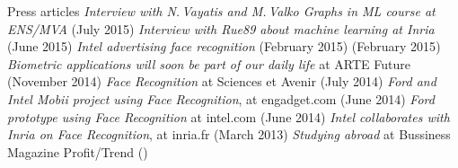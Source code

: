 \documentclass{resume}
\begin{document}

\begin{category}{Press articles}
\citembullet
\emph{Interview with N.\,Vayatis and M.\,Valko Graphs in ML course at ENS/MVA} ({\sf July 2015})
\citembullet
\emph{Interview with Rue89 about machine learning at Inria} ({\sf June 2015})
\citembullet
\emph{Intel advertising face recognition} (February 2015) ({\sf February 2015})
\citembullet
\emph{Biometric applications will soon be part of our daily life} at ARTE Future ({\sf November 2014})
\citembullet
\emph{Face Recognition} at Sciences et Avenir ({\sf July 2014})
\citembullet
\emph{Ford and Intel Mobii project using Face Recognition}, at engadget.com ({\sf June 2014}) 
\citembullet
\emph{Ford prototype using Face Recognition} at intel.com ({\sf June 2014}) 
\citembullet
\emph{Intel collaborates with Inria on Face Recognition}, at inria.fr ({\sf March 2013}) 
\citembullet
\emph{Studying abroad} at Bussiness Magazine Profit/Trend  ({})
 \end{category}
\end{document}
